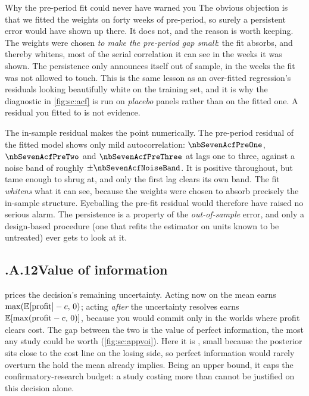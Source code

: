 \begin{intuition}{Why the pre-period fit could never have warned you}
The obvious objection is that we fitted the weights on forty weeks of pre-period, so surely a
persistent error would have shown up there. It does not, and the reason is worth keeping. The
weights were chosen \emph{to make the pre-period gap small}: the fit absorbs, and thereby
whitens, most of the serial correlation it can see in the weeks it was shown. The persistence only
announces itself out of sample, in the weeks the fit was not allowed to touch. This is the same
lesson as an over-fitted regression's residuals looking beautifully white on the training set, and
it is why the diagnostic in \cref{fig:sc:acf} is run on \emph{placebo} panels rather than on the
fitted one. A residual you fitted to is not evidence.
\end{intuition}

The in-sample residual makes the point numerically. The pre-period residual of the fitted model
shows only mild autocorrelation: $\nbSevenAcfPreOne$, $\nbSevenAcfPreTwo$ and
$\nbSevenAcfPreThree$ at lags one to three, against a noise band of roughly $\pm\nbSevenAcfNoiseBand$.
It is positive throughout, but tame enough to shrug at, and only the first lag clears its own band. The fit
\emph{whitens} what it can see, because the weights were chosen to absorb precisely the in-sample
structure. Eyeballing the pre-fit residual would therefore have raised no serious alarm. The
persistence is a property of the \emph{out-of-sample} error, and only a design-based procedure
(one that refits the estimator on units known to be untreated) ever gets to look at it.

\subsection*{\thechapter.A.12\quad Value of information}
\label{app:sc:voi}
 prices the decision's remaining uncertainty. Acting now on the mean earns
$\max(\operatorname{\mathbb{E}}[\text{profit}] - c,\, 0)$; acting \emph{after} the uncertainty resolves earns
$\operatorname{\mathbb{E}}[\max(\text{profit} - c,\, 0)]$, because you would commit only in the worlds where profit clears
cost. The gap between the two is the value of perfect information, the most any study could be worth
(\cref{fig:sc:appvoi}). Here it is \keur{\nbSevenVoi}, small because the posterior sits close to the
cost line on the losing side, so perfect information would rarely overturn the hold the mean already
implies. Being an upper bound, it caps the confirmatory-research budget: a study costing more than
\keur{\nbSevenVoi} cannot be justified on this decision alone.


